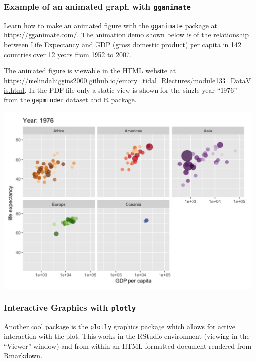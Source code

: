\documentclass[
  letterpaper,
  DIV=11,
  numbers=noendperiod]{scrartcl}
\begin{document}
\newpage

\subsubsection{\texorpdfstring{Example of an animated graph with
\texttt{gganimate}}{Example of an animated graph with gganimate}}\label{example-of-an-animated-graph-with-gganimate}

Learn how to make an animated figure with the \texttt{gganimate} package
at \url{https://gganimate.com/}. The animation demo shown below is of
the relationship between Life Expectancy and GDP (gross domestic
product) per capita in 142 countries over 12 years from 1952 to 2007.

The animated figure is viewable in the HTML website at
\url{https://melindahiggins2000.github.io/emory_tidal_Rlectures/module133_DataVis.html}.
In the PDF file only a static view is shown for the single year ``1976''
from the \href{https://jennybc.github.io/gapminder/}{\texttt{gapminder}}
dataset and R package.

\includegraphics[width=0.95\linewidth,height=\textheight,keepaspectratio]{myannimategif.png}

\newpage

\subsubsection{\texorpdfstring{Interactive Graphics with
\texttt{plotly}}{Interactive Graphics with plotly}}\label{interactive-graphics-with-plotly}

Another cool package is the \texttt{plotly} graphics package which
allows for active interaction with the plot. This works in the RStudio
environment (viewing in the ``Viewer'' window) and from within an HTML
formatted document rendered from Rmarkdown.
\end{document}
